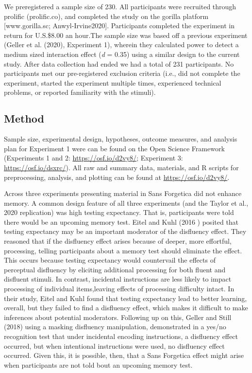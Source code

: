\documentclass[
  english,
  man]{apa6}
\begin{document}
We preregistered a sample size of 230. All participants were recruited through prolific (prolific.co), and completed the study on the gorilla platform {[}www.gorilla.sc; Anwyl-Irvine2020{]}. Participants completed the experiment in return for U.S.\$8.00 an hour.The sample size was based off a previous experiment (Geller et al. (2020), Experiment 1), wherein they calculated power to detect a medium sized interaction effect (\emph{d} = 0.35) using a similar design to the current study. After data collection had ended we had a total of 231 participants. No participants met our pre-registered exclusion criteria (i.e., did not complete the experiment, started the experiment multiple times, experienced technical problems, or reported familiarity with the stimuli).

\hypertarget{method}{%
\subsection{Method}\label{method}}

Sample size, experimental design, hypotheses, outcome measures, and analysis plan for Experiment 1 were can be found on the Open Science Framework (Experiments 1 and 2: \url{https://osf.io/d2vy8/}; Experiment 3: \url{https://osf.io/dsxrc/}). All raw and summary data, materials, and R scripts for preprocessing, analysis, and plotting can be found at \url{https://osf.io/d2vy8/}.

Across three experiments presenting material in Sans Forgetica did not enhance memory. A common design feature of all three experiments (and the Taylor et al., 2020 replication) was high testing expectancy. That is, participants were told there would be an upcoming memory test. Eitel and Kuhl (2016 ) posited that testing expectancy may be an important moderator of the disfluency effect. They reasoned that if the disfluency effect arises because of deeper, more effortful, processing, telling participants about a memory test should eliminate the effect. This occurs because testing expectancy would countervail the effects of perceptual disfluency by eliciting additional processing for both fluent and disfluent stimuli. In contrast, incidental instructions are less likely to impact processing of individual items,leaving effects of processing difficulty intact. In their study, Eitel and Kuhl found that testing expectancy lead to better learning, overall, but they failed to find a disfluency effect, which makes it difficult to make inferences about potential moderators. Following up on this, Geller and Still (2018) using a masking disfluency manipulation, demonstrated in a yes/no recognition test that under incidental encoding instructions, a disfluency effect occurred, but when intentional instructions were used, no disfluency effect occurred. Given this, it is possible, then, that a Sans Forgetica effect might arise when participants are not told bout an upcoming memory test.
\end{document}
